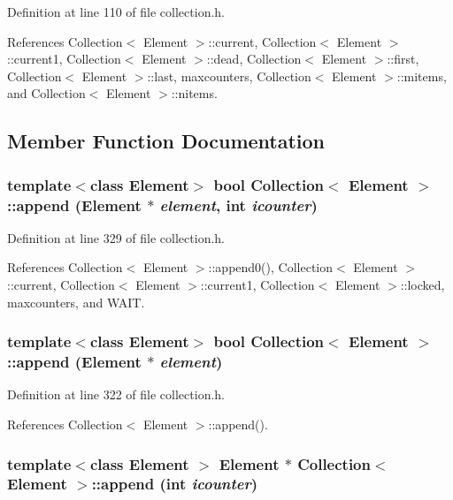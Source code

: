 Definition at line 110 of file collection.h.

References Collection$<$ Element $>$::current, Collection$<$ Element $>$::current1, Collection$<$ Element $>$::dead, Collection$<$ Element $>$::first, Collection$<$ Element $>$::last, maxcounters, Collection$<$ Element $>$::mitems, and Collection$<$ Element $>$::nitems.

\subsection{Member Function Documentation}
\hypertarget{classCollection_f510892bc93afe0cfc889a2dec875e51}{
\subsubsection[{append}]{\setlength{\rightskip}{0pt plus 5cm}template$<$class Element$>$ bool {\bf Collection}$<$ Element $>$::append (Element $\ast$ {\em element}, \/  int {\em icounter})}}
\label{classCollection_f510892bc93afe0cfc889a2dec875e51}




Definition at line 329 of file collection.h.

References Collection$<$ Element $>$::append0(), Collection$<$ Element $>$::current, Collection$<$ Element $>$::current1, Collection$<$ Element $>$::locked, maxcounters, and WAIT.\hypertarget{classCollection_026fa2048a7922f82c3dd6a3a29a5583}{
\subsubsection[{append}]{\setlength{\rightskip}{0pt plus 5cm}template$<$class Element$>$ bool {\bf Collection}$<$ Element $>$::append (Element $\ast$ {\em element})}}
\label{classCollection_026fa2048a7922f82c3dd6a3a29a5583}




Definition at line 322 of file collection.h.

References Collection$<$ Element $>$::append().\hypertarget{classCollection_c80cf8e48d9d4363eea79d46c682b468}{
\subsubsection[{append}]{\setlength{\rightskip}{0pt plus 5cm}template$<$class Element $>$ Element $\ast$ {\bf Collection}$<$ Element $>$::append (int {\em icounter})}}
\label{classCollection_c80cf8e48d9d4363eea79d46c682b468}




